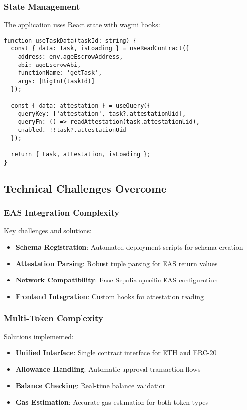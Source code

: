 \documentclass[12pt,a4paper]{article}
\begin{document}
\subsubsection{State Management}

The application uses React state with wagmi hooks:
\begin{lstlisting}[style=typescript]
function useTaskData(taskId: string) {
  const { data: task, isLoading } = useReadContract({
    address: env.ageEscrowAddress,
    abi: ageEscrowAbi,
    functionName: 'getTask',
    args: [BigInt(taskId)]
  });
  
  const { data: attestation } = useQuery({
    queryKey: ['attestation', task?.attestationUid],
    queryFn: () => readAttestation(task.attestationUid),
    enabled: !!task?.attestationUid
  });
  
  return { task, attestation, isLoading };
}
\end{lstlisting}

\subsection{Technical Challenges Overcome}

\subsubsection{EAS Integration Complexity}

Key challenges and solutions:
\begin{itemize}
    \item \textbf{Schema Registration}: Automated deployment scripts for schema creation
    \item \textbf{Attestation Parsing}: Robust tuple parsing for EAS return values
    \item \textbf{Network Compatibility}: Base Sepolia-specific EAS configuration
    \item \textbf{Frontend Integration}: Custom hooks for attestation reading
\end{itemize}

\subsubsection{Multi-Token Complexity}

Solutions implemented:
\begin{itemize}
    \item \textbf{Unified Interface}: Single contract interface for ETH and ERC-20
    \item \textbf{Allowance Handling}: Automatic approval transaction flows
    \item \textbf{Balance Checking}: Real-time balance validation
    \item \textbf{Gas Estimation}: Accurate gas estimation for both token types
\end{itemize}
\end{document}
